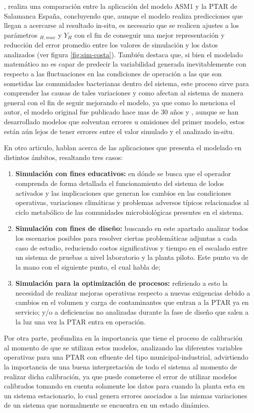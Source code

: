 \cite{Costa2022}, realiza una comparación entre la aplicación del modelo \acrshort{ASM}1 y la \acrshort{PTAR} de Salamanca España, concluyendo que, aunque el modelo realiza predicciones que llegan a acercarse al resultado in-situ, es necesario que se realicen ajustes a los parámetros \textit{}$_{H,max}$ y $Y_{H}$ con el fin de conseguir una mejor representación y reducción del error promedio entre los valores de simulación y los datos analizados (ver figura \ref{fig:sim-costa}). También destaca que, si bien el modelado matemático no es capar de predecir la variabilidad generada inevitablemente con respecto a las fluctuaciones en las condiciones de operación a las que son sometidas las comunidades bacterianas dentro del sistema, este proceso sirve para comprender las causas de tales variaciones y como afectan al sistema de manera general con el fin de seguir mejorando el modelo, ya que como lo menciona el autor, el modelo original fue publicado hace mas de 30 años y , aunque se han desarrollado modelos que solventan errores u omisiones del primer modelo, estos están aún lejos de tener errores entre el valor simulado y el analizado in-situ.\par
En otro articulo, \cite{Gernaey04} hablan acerca de las aplicaciones que presenta el modelado en distintos ámbitos, resaltando tres casos:
\begin{enumerate}
	\item \textbf{Simulación con fines educativos:} en dónde se busca que el operador comprenda de forma detallada el funcionamiento del sistema de lodos activados y las implicaciones que generan los cambios en las condiciones operativas, variaciones climáticas y problemas adversos típicos relacionados al ciclo metabólico de las comunidades microbiológicas presentes en el sistema.
	\item \textbf{Simulación con fines de diseño:} buscando en este apartado analizar todos los escenarios posibles para resolver ciertas problemáticas adjuntas a cada caso de estudio, reduciendo costos significativos y tiempo en el escalado entre un sistema de pruebas a nivel laboratorio y la planta piloto. Este punto va de la mano con el siguiente punto, el cual habla de;
	\item \textbf{Simulación para la optimización de procesos:} refiriendo a esto la necesidad de realizar mejoras operativas respecto a nuevas exigencias debido a cambios en el volumen y carga de contaminantes que entran a la \acrshort{PTAR} ya en servicio; y/o a deficiencias no analizadas durante la fase de diseño que salen a la luz una vez  la \acrshort{PTAR} entra en operación.
\end{enumerate}
Por otra parte, \cite{Petersen2002} profundiza en la importancia que tiene el proceso de calibración al momento de que se utilizan estos modelos, analizando las diferentes variables operativas para una \acrshort{PTAR} con \gls{efluente} del tipo municipal-industrial, advirtiendo la importancia de una buena interpretación de todo el sistema al momento de realizar dicha calibración, ya que puede cometerse el error de utilizar modelos calibrados tomando en cuenta solamente los datos para cuando la planta esta en un sistema estacionario, lo cual genera errores asociados a las mismas variaciones de un sistema que normalmente se encuentra en un estado dinámico.